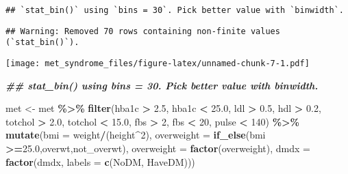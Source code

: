 \documentclass[
]{article}
\newenvironment{Shaded}{\begin{snugshade}}{\end{snugshade}}
\newcommand{\AttributeTok}[1]{\textcolor[rgb]{0.13,0.29,0.53}{#1}}
\newcommand{\DecValTok}[1]{\textcolor[rgb]{0.00,0.00,0.81}{#1}}
\newcommand{\DocumentationTok}[1]{\textcolor[rgb]{0.56,0.35,0.01}{\textbf{\textit{#1}}}}
\newcommand{\FloatTok}[1]{\textcolor[rgb]{0.00,0.00,0.81}{#1}}
\newcommand{\FunctionTok}[1]{\textcolor[rgb]{0.13,0.29,0.53}{\textbf{#1}}}
\newcommand{\NormalTok}[1]{#1}
\newcommand{\OtherTok}[1]{\textcolor[rgb]{0.56,0.35,0.01}{#1}}
\newcommand{\SpecialCharTok}[1]{\textcolor[rgb]{0.81,0.36,0.00}{\textbf{#1}}}
\newcommand{\StringTok}[1]{\textcolor[rgb]{0.31,0.60,0.02}{#1}}
\begin{document}
\begin{verbatim}
## `stat_bin()` using `bins = 30`. Pick better value with `binwidth`.
\end{verbatim}

\begin{verbatim}
## Warning: Removed 70 rows containing non-finite values (`stat_bin()`).
\end{verbatim}

\texttt{[image: met\_syndrome\_files/figure-latex/unnamed-chunk-7-1.pdf]}

\begin{Shaded}
\begin{Highlighting}[]
\DocumentationTok{\#\# \textasciigrave{}stat\_bin()\textasciigrave{} using \textasciigrave{}bins = 30\textasciigrave{}. Pick better value with \textasciigrave{}binwidth\textasciigrave{}.}
\end{Highlighting}
\end{Shaded}

\begin{Shaded}
\begin{Highlighting}[]
\NormalTok{met }\OtherTok{\textless{}{-}}\NormalTok{ met }\SpecialCharTok{\%\textgreater{}\%} 
  \FunctionTok{filter}\NormalTok{(hba1c }\SpecialCharTok{\textgreater{}} \FloatTok{2.5}\NormalTok{, hba1c }\SpecialCharTok{\textless{}} \FloatTok{25.0}\NormalTok{, }
\NormalTok{         ldl }\SpecialCharTok{\textgreater{}} \FloatTok{0.5}\NormalTok{, hdl }\SpecialCharTok{\textgreater{}} \FloatTok{0.2}\NormalTok{,  }
\NormalTok{         totchol }\SpecialCharTok{\textgreater{}} \FloatTok{2.0}\NormalTok{, totchol }\SpecialCharTok{\textless{}} \FloatTok{15.0}\NormalTok{,}
\NormalTok{         fbs }\SpecialCharTok{\textgreater{}} \DecValTok{2}\NormalTok{, fbs }\SpecialCharTok{\textless{}} \DecValTok{20}\NormalTok{,}
\NormalTok{         pulse }\SpecialCharTok{\textless{}} \DecValTok{140}\NormalTok{) }\SpecialCharTok{\%\textgreater{}\%} 
  \FunctionTok{mutate}\NormalTok{(}\AttributeTok{bmi =}\NormalTok{ weight}\SpecialCharTok{/}\NormalTok{(height}\SpecialCharTok{\^{}}\DecValTok{2}\NormalTok{), }
         \AttributeTok{overweight =} \FunctionTok{if\_else}\NormalTok{(bmi }\SpecialCharTok{\textgreater{}=}\FloatTok{25.0}\NormalTok{,}\StringTok{\textquotesingle{}overwt\textquotesingle{}}\NormalTok{,}\StringTok{\textquotesingle{}not\_overwt\textquotesingle{}}\NormalTok{),}
         \AttributeTok{overweight =} \FunctionTok{factor}\NormalTok{(overweight),}
         \AttributeTok{dmdx =} \FunctionTok{factor}\NormalTok{(dmdx, }\AttributeTok{labels =} \FunctionTok{c}\NormalTok{(}\StringTok{\textquotesingle{}NoDM\textquotesingle{}}\NormalTok{, }\StringTok{\textquotesingle{}HaveDM\textquotesingle{}}\NormalTok{)))}
\end{Highlighting}
\end{Shaded}
\end{document}
